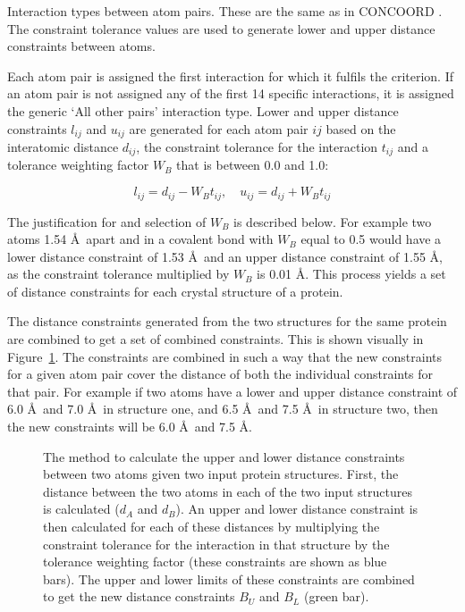 \begin{table}
\caption{Interaction types between atom pairs.
These are the same as in CONCOORD \cite{DeGroot1997}.
The constraint tolerance values are used to generate lower and upper distance constraints between atoms.}

\label{tab:interaction_types}
\end{table}


Each atom pair is assigned the first interaction for which it fulfils the criterion.
If an atom pair is not assigned any of the first 14 specific interactions, it is assigned the generic `All other pairs' interaction type.
Lower and upper distance constraints $l_{ij}$ and $u_{ij}$ are generated for each atom pair $ij$ based on the interatomic distance $d_{ij}$, the constraint tolerance for the interaction $t_{ij}$ and a tolerance weighting factor $W_{B}$ that is between 0.0 and 1.0:

$$
l_{ij} = d_{ij} - W_{B} t_{ij}, \quad u_{ij} = d_{ij} + W_{B} t_{ij}
$$

The justification for and selection of $W_{B}$ is described below.
For example two atoms 1.54 \AA\ apart and in a covalent bond with $W_{B}$ equal to 0.5 would have a lower distance constraint of 1.53 \AA\ and an upper distance constraint of 1.55 \AA, as the constraint tolerance multiplied by $W_{B}$ is 0.01 \AA.
This process yields a set of distance constraints for each crystal structure of a protein.

The distance constraints generated from the two structures for the same protein are combined to get a set of combined constraints.
This is shown visually in Figure~\ref{fig:distance_constraints}.
The constraints are combined in such a way that the new constraints for a given atom pair cover the distance of both the individual constraints for that pair.
For example if two atoms have a lower and upper distance constraint of 6.0 \AA\ and 7.0 \AA\ in structure one, and 6.5 \AA\ and 7.5 \AA\ in structure two, then the new constraints will be 6.0 \AA\ and 7.5 \AA.


\begin{figure}
\centering


\caption{The method to calculate the upper and lower distance constraints between two atoms given two input protein structures.
First, the distance between the two atoms in each of the two input structures is calculated ($d_{A}$ and $d_{B}$).
An upper and lower distance constraint is then calculated for each of these distances by multiplying the constraint tolerance for the interaction in that structure by the tolerance weighting factor (these constraints are shown as blue bars).
The upper and lower limits of these constraints are combined to get the new distance constraints $B_{U}$ and $B_{L}$ (green bar).}

\label{fig:distance_constraints}
\end{figure}


